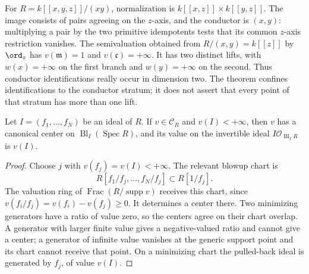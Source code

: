 \begin{example}\label{ex:p121-surface-conductor-fiber}
For $R=k[[x,y,z]]/(xy)$, normalization is
$k[[x,z]]\times k[[y,z]]$. The image consists of pairs agreeing
on the $z$-axis, and the conductor is $(x,y)$: multiplying a pair
by the two primitive idempotents tests that its common $z$-axis
restriction vanishes. The semivaluation obtained from
$R/(x,y)=k[[z]]$ by $\ord_z$ has $v(\mathfrak m)=1$ and
$v(\mathfrak c)=+\infty$. It has two distinct lifts, with
$w(x)=+\infty$ on the first branch and $w(y)=+\infty$ on the
second. Thus conductor identifications really occur in dimension two.
The theorem confines identifications to the conductor stratum; it does
not assert that every point of that stratum has more than one lift.
\end{example}

\begin{proposition}\label{prop:p121-blowup-boundary-gauge}
Let $I=(f_1,\ldots,f_N)$ be an ideal of $R$. If $v\in\mathcal C_R$
and $v(I)<+\infty$, then $v$ has a canonical center on
$\operatorname{Bl}_I(\operatorname{Spec}R)$, and its value on the
invertible ideal $I\mathcal O_{\operatorname{Bl}_I R}$ is $v(I)$.
\end{proposition}

\begin{proof}
Choose $j$ with $v(f_j)=v(I)<+\infty$. The relevant blowup chart is
\[
                  R[f_1/f_j,\ldots,f_N/f_j]\subset R[1/f_j].
\]
The valuation ring of $\operatorname{Frac}(R/\operatorname{supp}v)$
receives this chart, since $v(f_i/f_j)=v(f_i)-v(f_j)\geq0$.
It determines a center there. Two minimizing generators have a ratio
of value zero, so the centers agree on their chart overlap. A generator
with larger finite value gives a negative-valued ratio and cannot give
a center; a generator of infinite value vanishes at the generic
support point and its chart cannot receive that point. On a minimizing
chart the pulled-back ideal is generated by $f_j$, of value $v(I)$.
\end{proof}

